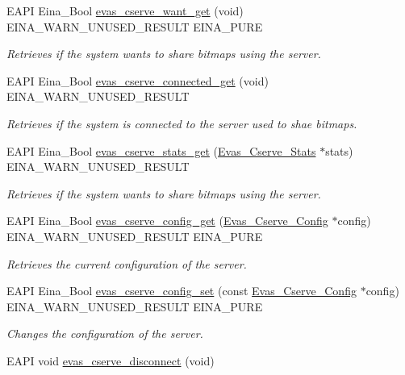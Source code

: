 \begin{DoxyCompactItemize}
EAPI Eina\_\-Bool \hyperlink{group__Evas__Cserve_gab039ccd04ab2e8857a0df629b4ac0901}{evas\_\-cserve\_\-want\_\-get} (void) EINA\_\-WARN\_\-UNUSED\_\-RESULT EINA\_\-PURE
\begin{DoxyCompactList}\small\item\em Retrieves if the system wants to share bitmaps using the server. \item\end{DoxyCompactList}\item 
EAPI Eina\_\-Bool \hyperlink{group__Evas__Cserve_gab88ee4c01dbdf01fea4d8acf4a07b25f}{evas\_\-cserve\_\-connected\_\-get} (void) EINA\_\-WARN\_\-UNUSED\_\-RESULT
\begin{DoxyCompactList}\small\item\em Retrieves if the system is connected to the server used to shae bitmaps. \item\end{DoxyCompactList}\item 
EAPI Eina\_\-Bool \hyperlink{group__Evas__Cserve_ga82fec634eb97f664e9cb3ed08358b1a2}{evas\_\-cserve\_\-stats\_\-get} (\hyperlink{struct__Evas__Cserve__Stats}{Evas\_\-Cserve\_\-Stats} $\ast$stats) EINA\_\-WARN\_\-UNUSED\_\-RESULT
\begin{DoxyCompactList}\small\item\em Retrieves if the system wants to share bitmaps using the server. \item\end{DoxyCompactList}\item 
EAPI Eina\_\-Bool \hyperlink{group__Evas__Cserve_ga9bb7fbd93f4bc9310707549ff9427b47}{evas\_\-cserve\_\-config\_\-get} (\hyperlink{struct__Evas__Cserve__Config}{Evas\_\-Cserve\_\-Config} $\ast$config) EINA\_\-WARN\_\-UNUSED\_\-RESULT EINA\_\-PURE
\begin{DoxyCompactList}\small\item\em Retrieves the current configuration of the server. \item\end{DoxyCompactList}\item 
EAPI Eina\_\-Bool \hyperlink{group__Evas__Cserve_ga10c38a7bfb59423c2a96447b42c2aa15}{evas\_\-cserve\_\-config\_\-set} (const \hyperlink{struct__Evas__Cserve__Config}{Evas\_\-Cserve\_\-Config} $\ast$config) EINA\_\-WARN\_\-UNUSED\_\-RESULT EINA\_\-PURE
\begin{DoxyCompactList}\small\item\em Changes the configuration of the server. \item\end{DoxyCompactList}\item 
EAPI void \hyperlink{group__Evas__Cserve_ga3129abb4410e7d6967072f14ac327daf}{evas\_\-cserve\_\-disconnect} (void)\label{group__Evas__Cserve_ga3129abb4410e7d6967072f14ac327daf}


\end{DoxyCompactItemize}
